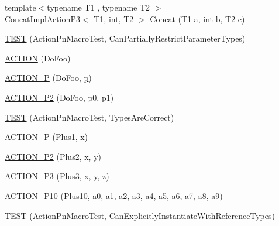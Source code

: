 \begin{DoxyCompactItemize}
{\footnotesize template$<$typename T1 , typename T2 $>$ }\\Concat\+Impl\+Action\+P3$<$ T1, int, T2 $>$ \hyperlink{namespacetesting_1_1gmock__generated__actions__test_a861e9fadbecf0c66e8226021c6c22013}{Concat} (T1 \hyperlink{_07copy_08_2_read_camera_model_8m_a551a3d351eadcc0b9b1a2f24f0fb5ea0}{a}, int \hyperlink{jquery_8js_a2fa551895933fae935a0a6b87282241d}{b}, T2 \hyperlink{jquery_8js_abce695e0af988ece0826d9ad59b8160d}{c})
\item 
\hyperlink{namespacetesting_1_1gmock__generated__actions__test_a7222610b197216e7976b3fa751f97daf}{T\+E\+ST} (Action\+Pn\+Macro\+Test, Can\+Partially\+Restrict\+Parameter\+Types)
\item 
\hyperlink{namespacetesting_1_1gmock__generated__actions__test_a183b3863b3c2319ac414fe694455f58c}{A\+C\+T\+I\+ON} (Do\+Foo)
\item 
\hyperlink{namespacetesting_1_1gmock__generated__actions__test_a8487a3396f4f705e134e44584634ef1c}{A\+C\+T\+I\+O\+N\+\_\+P} (Do\+Foo, \hyperlink{jquery_8js_a2335e57f79b6acfb6de59c235dc8a83e}{p})
\item 
\hyperlink{namespacetesting_1_1gmock__generated__actions__test_acd38e742235e154ad309f22e9a470a86}{A\+C\+T\+I\+O\+N\+\_\+\+P2} (Do\+Foo, p0, p1)
\item 
\hyperlink{namespacetesting_1_1gmock__generated__actions__test_ad702feced8b71b3708782b1a2274453e}{T\+E\+ST} (Action\+Pn\+Macro\+Test, Types\+Are\+Correct)
\item 
\hyperlink{namespacetesting_1_1gmock__generated__actions__test_a89c01b82e854ad79e3d139aa72477747}{A\+C\+T\+I\+O\+N\+\_\+P} (\hyperlink{namespacetesting_1_1gmock__generated__actions__test_a75e901c6d28c591c53a54320a294da55}{Plus1}, x)
\item 
\hyperlink{namespacetesting_1_1gmock__generated__actions__test_a0e2768c0fae30bc46ec6e322b29dd54c}{A\+C\+T\+I\+O\+N\+\_\+\+P2} (Plus2, x, y)
\item 
\hyperlink{namespacetesting_1_1gmock__generated__actions__test_afc911947c840aa9857eb2d06e4d80787}{A\+C\+T\+I\+O\+N\+\_\+\+P3} (Plus3, x, y, z)
\item 
\hyperlink{namespacetesting_1_1gmock__generated__actions__test_a4e48e01a7bfc369d279cc0c99a7d3c60}{A\+C\+T\+I\+O\+N\+\_\+\+P10} (Plus10, a0, a1, a2, a3, a4, a5, a6, a7, a8, a9)
\item 
\hyperlink{namespacetesting_1_1gmock__generated__actions__test_a20664d32f08c53d6f9fa5e020a85fab3}{T\+E\+ST} (Action\+Pn\+Macro\+Test, Can\+Explicitly\+Instantiate\+With\+Reference\+Types)

\end{DoxyCompactItemize}
